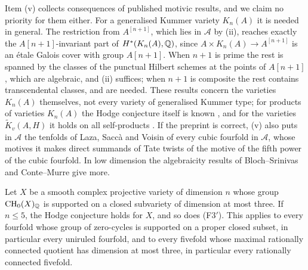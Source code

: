 Item (v) collects consequences of published motivic results, and we claim no
priority for them either. For a generalised Kummer variety $K_{n}(A)$ it is
needed in general. The restriction from $A^{[n+1]}$, which lies in
$\mathcal{A}$ by (ii), reaches exactly the $A[n+1]$-invariant part of
$H^{*}(K_{n}(A),\mathbb{Q})$, since $A\times K_{n}(A)\to A^{[n+1]}$ is an \'etale
Galois cover with group $A[n+1]$. When $n+1$ is prime the rest is spanned by
the classes of the punctual Hilbert schemes at the points of $A[n+1]$, which
are algebraic, and (ii) suffices; when $n+1$ is composite the rest contains
transcendental classes, and \cite{Xu15,FTV19} are needed. These results
concern the varieties $K_{n}(A)$ themselves, not every variety of
generalised Kummer type; for products of varieties $K_{n}(A)$ the Hodge
conjecture itself is known \cite[Theorem~3.3]{Xu15}, and for the varieties
$\widetilde K_{v}(A,H)$ it holds on all self-products
\cite[Corollary~1.2]{Flo23}. If the
preprint \cite{Ped26} is correct, (v) also puts in $\mathcal{A}$ the tenfolds
of Laza, Sacc\`a and Voisin of every cubic fourfold in $\mathcal{A}$, whose
motives it makes direct summands of Tate twists of the motive of the fifth
power of the cubic fourfold. In low dimension the algebraicity results of
Bloch--Srinivas and Conte--Murre give more.

\begin{proposition}
\label{prop:f3primesmall}
Let $X$ be a smooth complex projective variety of dimension $n$ whose group
$\mathrm{CH}_{0}(X)_{\mathbb{Q}}$ is supported on a closed subvariety of dimension at
most three. If $n\le5$, the Hodge conjecture holds for $X$, and so does
\textup{(F3$'$)}. This applies to every fourfold whose group of zero-cycles
is supported on a proper closed subset, in particular every uniruled
fourfold, and to every fivefold whose maximal rationally connected quotient
has dimension at most three, in particular every rationally connected
fivefold.
\end{proposition}

